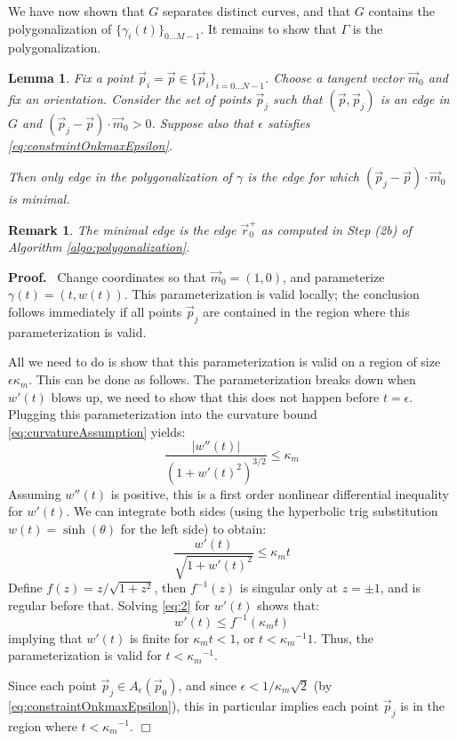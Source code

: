 \documentclass{article}
\newtheorem{varremark}[cntr]{Remark}
\newenvironment{remark}{\begin{varremark}\em}{\em\end{varremark}}
\newenvironment{proof}{
  \noindent\textbf{Proof.}\ }{\hspace*{\fill}
  \begin{math}\Box\end{math}\medskip}
\newtheorem{lemma}[cntr]{Lemma}
\numberwithin{cntr}{section}
\numberwithin{equation}{section}
\newcommand{\abs}[1]{\left| #1 \right|}%
\newcommand{\vp}[0]{{\vec{p}}}
\newcommand{\vr}[0]{{\vec{r}}}
\newcommand{\vm}[0]{{\vec{m}}}
\newcommand{\Oto}[1]{{0 \ldots #1-1}}
\newcommand{\OtoN}{{0 \ldots N-1}}
\newcommand{\pointData}{{ \{ \vp_{i} \}_{i=\OtoN} }}
\newcommand{\curveSet}{{ \{ \gamma_i(t) \}_{\Oto{M}}}}
\newcommand{\allowed}[2]{ { A_{#1}(#2) } }
\newcommand{\curvemax}{{\kappa_{m}}}
\newcommand{\curvemaxi}{{\curvemax^{-1}}}
\begin{document}
We have now shown that $G$ separates distinct curves, and that $G$ contains the polygonalization of $\curveSet$. It remains to show that $\Gamma$ is the polygonalization.

\begin{lemma}
  \label{eq:closestTangentPointInAllowedRegionIsCorrect}
  Fix a point $\vp_{i}=\vp \in \pointData$. Choose a tangent vector $\vm_{0}$ and fix an orientation. Consider the set of points $\vp_{j}$ such that $(\vp, \vp_{j})$ is an edge in $G$ and $(\vp_{j} - \vp) \cdot \vm_{0} > 0$. Suppose also that $\epsilon$ satisfies \eqref{eq:constraintOnkmaxEpsilon}.

  Then only edge in the polygonalization of $\gamma$ is the edge for which $(\vp_{j} - \vp) \cdot \vm_{0}$ is minimal.
\end{lemma}

\begin{remark}
  The minimal edge is the edge $\vr^{+}_{0}$ as computed in Step (2b) of Algorithm \ref{algo:polygonalization}.
\end{remark}

\begin{proof}
  Change coordinates so that $\vm_{0} = (1,0)$, and parameterize $\gamma(t)=(t,w(t))$. This parameterization is valid locally; the conclusion follows immediately if all points $\vp_{j}$ are contained in the region where this parameterization is valid.

  All we need to do is show that this parameterization is valid on a region of size $\epsilon \curvemax$. This can be done as follows. The parameterization breaks down when $w'(t)$ blows up, we need to show that this does not happen before $t=\epsilon$. Plugging this parameterization into the curvature bound \eqref{eq:curvatureAssumption} yields:
  \begin{equation*}
    \frac{ \abs{w''(t)} }{(1+w'(t)^{2})^{3/2}} \leq \curvemax
  \end{equation*}
  Assuming $w''(t)$ is positive, this is a first order nonlinear differential inequality for $w'(t)$. We can integrate both sides (using the hyperbolic trig substitution $w(t)=\sinh(\theta)$ for the left side) to obtain:
  \begin{equation}
    \label{eq:2}
    \frac{w'(t)}{\sqrt{1+w'(t)^{2}}} \leq \curvemax t
  \end{equation}
  Define $f(z)=z/\sqrt{1+z^{2}}$, then $f^{-1}(z)$ is singular only at $z=\pm 1$, and is regular before that. Solving \eqref{eq:2} for $w'(t)$ shows that:
  \begin{equation*}
    w'(t) \leq f^{-1}(\curvemax t)
  \end{equation*}
  implying that $w'(t)$ is finite for $\curvemax t < 1$, or $t < \curvemaxi 1$. Thus, the parameterization is valid for $t < \curvemaxi$.

  Since each point $\vp_{j} \in \allowed{\epsilon}{\vp_{0}}$, and since $\epsilon < 1/\curvemax \sqrt{2}$ (by \eqref{eq:constraintOnkmaxEpsilon}), this in particular implies each point $\vp_{j}$ is in the region where $t < \curvemaxi$.
\end{proof}
\end{document}
